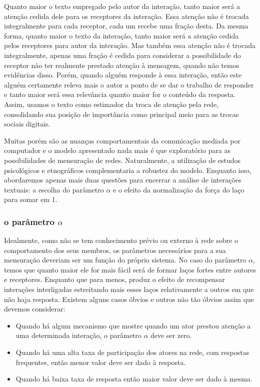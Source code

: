 \documentclass{article}
\begin{document}
Quanto maior o texto empregado pelo autor da interação, tanto maior será a
atenção cedida dele para os receptores da interação. Essa atenção não é trocada
integralmente para cada receptor, cada um recebe uma fração desta. Da mesma
forma, quanto maior o texto da interação, tanto maior será a atenção cedida
pelos receptores para autor da interação. Mas também essa atenção não é trocada
integralmente, apenas uma fração é cedida para considerar a possibilidade do
receptor não ter realmente prestado atenção à mensagem, quando não temos
evidências disso. Porém, quando alguém responde à essa interação, então este
alguém certamente releva mais o autor a ponto de se dar o trabalho de responder
e tanto maior será essa relevância quanto maior for o conteúdo da resposta.
Assim, usamos o texto como estimador da troca de atenção pela rede, consolidando
sua posição de importância como principal meio para as trocas sociais digitais.

Muitas porém são as nuanças comportamentais da comunicação mediada por
computador e o modelo apresentado nada mais é que exploratório para as
possibilidades de mensuração de redes. Naturalmente, a utilização de estudos
psicológicos e etnográficos complementaria a robustez do modelo. Enquanto isso,
abordaremos apenas mais duas questões para encerrar a análise de interações
textuais: a escolha do parâmetro $\alpha$ e o efeito da normalização da força do
laço para somar em 1.

\subsubsection{o parâmetro $\alpha$}

Idealmente, como não se tem conhecimento prévio ou externo à rede sobre o
comportamento dos seus membros, os parâmetros necessários para a sua mensuração
deveriam ser um função do próprio sistema. No caso do parâmetro $\alpha$, temos
que quanto maior ele for mais fácil será de formar laços fortes entre autores e
receptores. Enquanto que para menos, produz o efeito de recompensar interações
interligadas estreitando mais esses laços relativamente a outros em que não haja
resposta. Existem alguns casos óbvios e outros não tão óbvios assim que devemos
considerar:
\begin{itemize}
  \item Quando há algum mecanismo que mostre quando um ator prestou atenção a
  uma determinada interação, o parâmetro $\alpha$ deve ser zero.
  \item Quando há uma alta taxa de participação dos atores na rede, com
  respostas frequentes, então menor valor deve ser dado à resposta.
  \item Quando há baixa taxa de resposta então maior valor deve ser dado à
  mesma.
\end{itemize}
\end{document}
